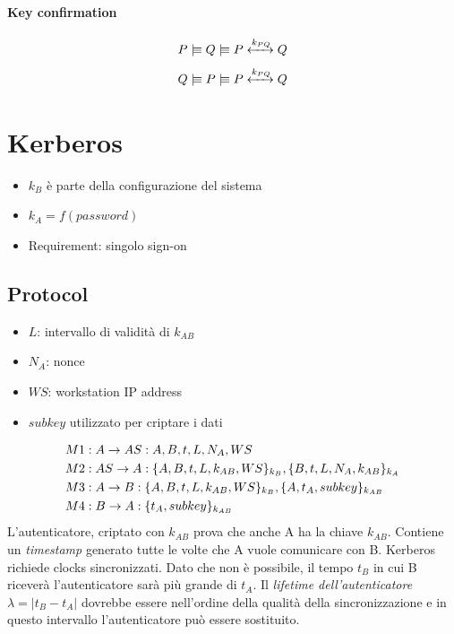 \documentclass[a4paper,12pt]{article}
\newcommand{\believes}{\mid\!\equiv}
\newcommand{\sharekey}[1]{\xleftrightarrow{#1}}
\begin{document}
\paragraph{Key confirmation}
\[P \believes Q \believes P \sharekey{k_{PQ}} Q\]
\[Q \believes P \believes P \sharekey{k_{PQ}} Q\]

\section{Kerberos}

\begin{itemize}
	\item $k_B$ è parte della configurazione del sistema
	\item $k_A = f(password)$
	\item Requirement: singolo sign-on 
\end{itemize}

\subsection{Protocol}
\begin{itemize}
	\item $L$: intervallo di validità di $k_{AB}$
	\item $N_A$: nonce
	\item $WS$: workstation IP address
	\item $subkey$ utilizzato per criptare i dati
\end{itemize}
\begin{align}
&M1: A \to AS: A,B,t,L,N_A,WS \notag \\
&M2: AS \to A: \{A,B,t,L,k_{AB},WS\}_{k_B}, \{B,t,L,N_A,k_{AB}\}_{k_A} \notag \\
&M3: A \to B: \{A,B,t,L,k_{AB},WS\}_{k_B}, \{A,t_A, subkey\}_{k_{AB}} \notag \\
&M4: B \to A: \{t_A, subkey\}_{k_{AB}} \notag
\end{align}
L'autenticatore, criptato con $k_{AB}$ prova che anche A ha la chiave $k_{AB}$. Contiene un \textit{timestamp} generato tutte le volte che A vuole comunicare con B.
Kerberos richiede clocks sincronizzati. Dato che non è possibile, il tempo $t_B$ in cui B riceverà l'autenticatore sarà più grande di $t_A$.
Il \textit{lifetime dell'autenticatore} $\lambda = |t_B - t_A|$ dovrebbe essere nell'ordine della qualità della sincronizzazione e in questo intervallo l'autenticatore può essere sostituito.
\end{document}
